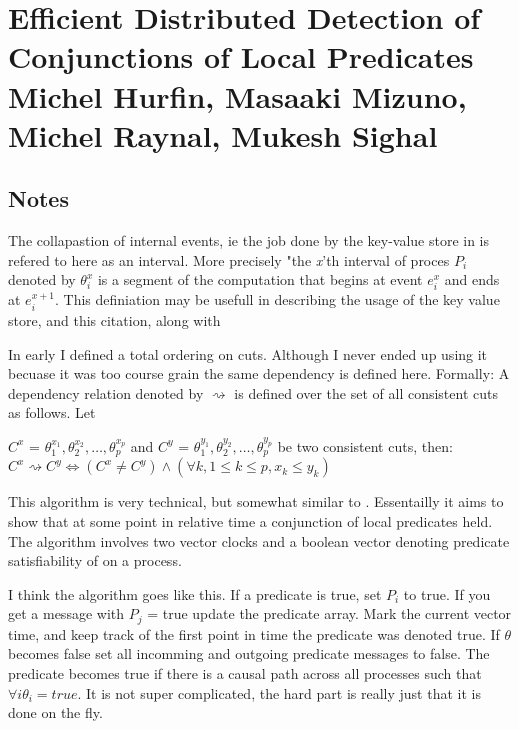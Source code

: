 \section{Efficient Distributed Detection of Conjunctions of Local Predicates \\ \small{ Michel Hurfin, Masaaki Mizuno, Michel Raynal, Mukesh Sighal}}

\subsection{Notes}

The collapastion of internal events, ie the job done by the key-value store in
\dinv is refered to here as an interval. More precisely "the \textit{x}'th
interval of proces $P_i$ denoted by $\theta_i^x$ is a segment of the
computation that begins at event $e^x_i$ and ends at $e^{x+1}_i$. This
definiation may be usefull in describing the usage of the key value store, and
this citation, along with 

In early \dinv I defined a total ordering on cuts. Although I never ended up
using it becuase it was too course grain the same dependency is defined here.
Formally: A dependency relation denoted by $\rightsquigarrow$ is defined over
the set of all consistent cuts as follows. Let 

$C^x$ = $\theta^{x_1}_1, \theta^{x_2}_2, \dots , \theta^{x_p}_p$ 
and 
$C^y$ = $\theta^{y_1}_1, \theta^{y_2}_2, \dots , \theta^{y_p}_p$ 
be two consistent cuts, then: 
$C^x \rightsquigarrow C^y \iff (C^x \neq C^y) \wedge (\forall k, 1 \leq k \leq p , x_k \leq y_k)$ 

This algorithm is very technical, but somewhat similar to \dinv. Essentailly it
aims to show that at some point in relative time a conjunction of local
predicates held. The algorithm involves two vector clocks and a boolean vector
denoting predicate satisfiability of on a process. 

I think the algorithm goes like this.  If a predicate is true, set $P_i$ to
true. If you get a message with $P_j$ = true update the predicate array. Mark
the current vector time, and keep track of the first point in time the
predicate was denoted true. If $\theta$ becomes false set all incomming and
outgoing predicate messages to false. The predicate becomes true if there is a
causal path across all processes such that $\forall i \theta_i = true$. It is
not super complicated, the hard part is really just that it is done on the fly.

